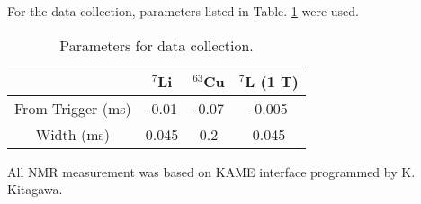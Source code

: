 For the data collection, parameters listed in Table. \ref{trig} were used.
\begin{table}
\begin{center}
\caption{Parameters for data collection.}
\begin{tabular}{cccc} \hline
                  & ${}^7$Li& ${}^{63}$Cu& ${}^7$L (1 T)\\ \hline
 From Trigger (ms)& -0.01& -0.07& -0.005\\ \hline
 Width (ms)& 0.045& 0.2& 0.045\\ \hline
\end{tabular}
\label{trig}
\end{center}
\end{table}

All NMR measurement was based on KAME interface programmed by K. Kitagawa.
